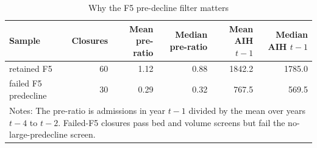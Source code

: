 \begin{table}[!htbp]\centering
\caption{Why the F5 pre-decline filter matters}
\label{tab:f5-vs-failed-f5-diagnostics}
\small
\begin{tabular}{lrrrrr}
\toprule
Sample & Closures & Mean pre-ratio & Median pre-ratio & Mean AIH $t-1$ & Median AIH $t-1$ \\
\midrule
retained F5 & 60 & 1.12 & 0.88 & 1842.2 & 1785.0 \\
failed F5 predecline & 30 & 0.29 & 0.32 & 767.5 & 569.5 \\
\bottomrule
\multicolumn{6}{p{0.82\textwidth}}{\footnotesize Notes: The pre-ratio is admissions in year $t-1$ divided by the mean over years $t-4$ to $t-2$. Failed-F5 closures pass bed and volume screens but fail the no-large-predecline screen.}\\
\end{tabular}
\end{table}
